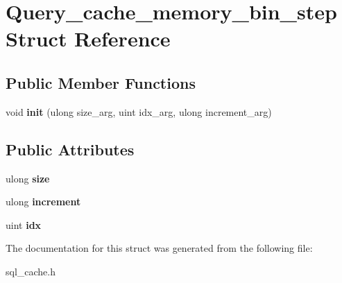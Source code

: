 \hypertarget{structQuery__cache__memory__bin__step}{}\section{Query\+\_\+cache\+\_\+memory\+\_\+bin\+\_\+step Struct Reference}
\label{structQuery__cache__memory__bin__step}
\subsection*{Public Member Functions}
\begin{DoxyCompactItemize}
\item 
\mbox{\label{structQuery__cache__memory__bin__step_af113fc1aadbc1949cfffa21ccde1e549}} 
void {\bfseries init} (ulong size\+\_\+arg, uint idx\+\_\+arg, ulong increment\+\_\+arg)
\end{DoxyCompactItemize}
\subsection*{Public Attributes}
\begin{DoxyCompactItemize}
\item 
\mbox{\label{structQuery__cache__memory__bin__step_a113ef7bec0290878dbb7a3c86685ef32}} 
ulong {\bfseries size}
\item 
\mbox{\label{structQuery__cache__memory__bin__step_a060b3bc1db23198a78678729c8388fa2}} 
ulong {\bfseries increment}
\item 
\mbox{\label{structQuery__cache__memory__bin__step_a8706866f137acd718e6177230f6e6caa}} 
uint {\bfseries idx}
\end{DoxyCompactItemize}


The documentation for this struct was generated from the following file\+:\begin{DoxyCompactItemize}
\item 
sql\+\_\+cache.\+h\end{DoxyCompactItemize}
